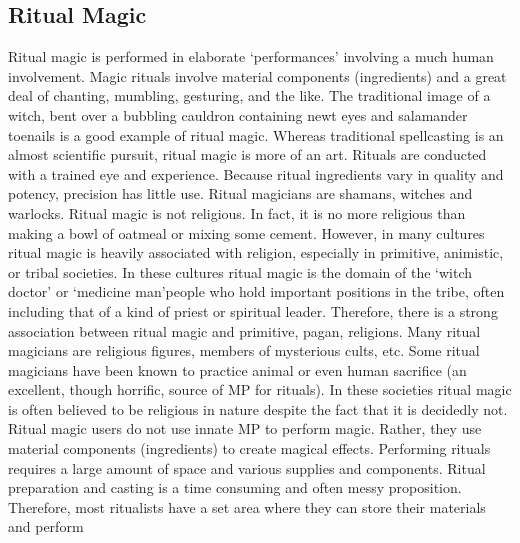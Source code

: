 \documentclass[twoside]{book}
\begin{document}
\subsection{Ritual Magic}
      Ritual magic is performed in elaborate
               `performances' involving a much human
               involvement. Magic rituals involve material components
               (ingredients) and a great deal of chanting, mumbling,
               gesturing, and the like. The traditional image of a witch,
               bent over a bubbling cauldron containing newt eyes and
               salamander toenails is a good example of ritual magic.
               Whereas traditional spellcasting is an almost scientific
               pursuit, ritual magic is more of an art. Rituals are
               conducted with a trained eye and experience. Because
               ritual ingredients vary in quality and potency, precision
               has little use. Ritual magicians are shamans, witches and
               warlocks.   Ritual magic is not religious. In fact, it is no
               more religious than making a bowl of oatmeal or mixing
               some cement. However, in many cultures ritual magic is
               heavily associated with religion, especially in primitive,
               animistic, or tribal societies. In these cultures ritual
               magic is the domain of the `witch doctor' or
               `medicine man'people who hold important
               positions in the tribe, often including that of a kind of
               priest or spiritual leader. Therefore, there is a strong
               association between ritual magic and primitive, pagan,
               religions. Many ritual magicians are religious figures,
               members of mysterious cults, etc. Some ritual magicians
               have been known to practice animal or even human sacrifice
               (an excellent, though horrific, source of MP for rituals).
               In these societies ritual magic is often believed to be
               religious in nature despite the fact that it is decidedly
               not.   Ritual magic users do not use innate MP to perform
               magic. Rather, they use material components (ingredients)
               to create magical effects. Performing rituals requires a
               large amount of space and various supplies and components.
               Ritual preparation and casting is a time consuming and
               often messy proposition. Therefore, most ritualists have a
               set area where they can store their materials and perform
\end{document}
